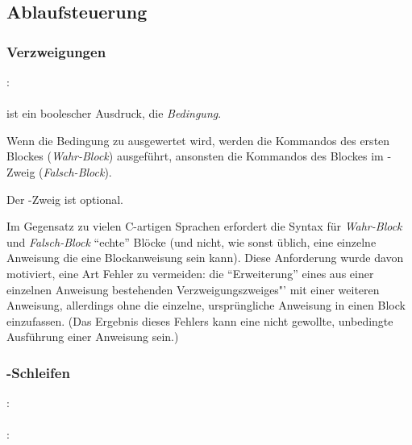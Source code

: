 \subsection{Ablaufsteuerung}\label{Ablaufsteuerung}
\subsubsection{Verzweigungen}\label{Verzweigungen}
:\label{verzweigung}\\
\hspace*{1cm}\Gspace\Gt{(}\Gspace{} \Gspace\Gt{)}\Gspace\Gt{\{}\Gspace{} \Gspace\Gt{\}}\Gspace{}\\

\glq{}\grq{} ist ein boolescher Ausdruck, die \emph{Bedingung}.

Wenn die Bedingung zu  ausgewertet wird, werden die Kommandos des ersten Blockes (\emph{Wahr-Block}) ausgeführt,
ansonsten die Kommandos des Blockes im -Zweig (\emph{Falsch-Block}).

Der -Zweig ist optional.


Im Gegensatz zu vielen C-artigen Sprachen erfordert die Syntax für \emph{Wahr-Block} und \emph{Falsch-Block}
"`echte"' Blöcke (und nicht, wie sonst üblich, eine einzelne Anweisung  die eine Blockanweisung sein kann).
Diese Anforderung wurde davon motiviert, eine Art Fehler zu vermeiden: die "`Erweiterung"' eines aus einer einzelnen
Anweisung bestehenden Verzweigungszweiges"' mit einer weiteren Anweisung, allerdings ohne die einzelne, ursprüngliche
Anweisung in einen Block einzufassen. (Das Ergebnis dieses Fehlers kann eine nicht gewollte, unbedingte Ausführung
einer Anweisung sein.)


\subsubsection{-Schleifen}\label{$_backslash$kw__for__-Schleifen}
:\label{schleife_for}\\
\hspace*{1cm}\Gspace\Gt{(}\Gspace{} \Gspace\Gt{)}\Gspace\Gt{\{}\Gspace{} \Gspace\Gt{\}}\\
:\label{schleife_for_kopf}\\
\hspace*{1cm}\Gspace\Gt{;}\Gspace{}\Gspace\Gt{;}\Gspace{}\\

